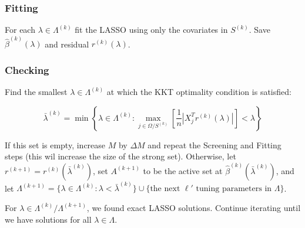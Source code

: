 \documentclass{amsart}
\begin{document}
\subsubsection{Fitting} For each $\lambda \in \Lambda^{(k)}$ fit the LASSO using
only the covariates in $S^{(k)}$. Save $\hat{\beta}^{(k)}(\lambda)$ and residual
$r^{(k)}(\lambda)$.

\subsubsection{Checking} Find the smallest $\lambda \in \Lambda^{(k)}$ at which
the KKT optimality condition is satisfied:

$$\bar{\lambda}^{(k)} = \min \left\{\lambda \in \Lambda^{(k)} : \max_{j \in \Omega /
S^{(k)}} \left[\frac1n|X_j^Tr^{(k)}(\lambda)| \right] < \lambda \right\}$$

If this set is empty, increase $M$ by $\Delta M$ and repeat the Screening and
Fitting steps (this wil increase the size of the strong set). Otherwise, let
$r^{(k+1)} = r^{(k)}(\bar{\lambda}^{(k)})$, set $A^{(k+1)}$ to be the active set
at $\hat{\beta}^{(k)}(\bar{\lambda}^{(k)})$, and let $\Lambda^{(k+1)} = \{
\lambda \in \Lambda^{(k)} : \lambda < \bar{\lambda}^{(k)} \} \cup \{\textrm{the
next  } \ell' \textrm{  tuning parameters in  } \Lambda \}$. 

\bigskip

For $\lambda \in
\Lambda^{(k)} / \Lambda^{(k+1)}$, we found exact LASSO solutions. Continue
iterating until we have solutions for all $\lambda \in \Lambda$. 



\end{document}

